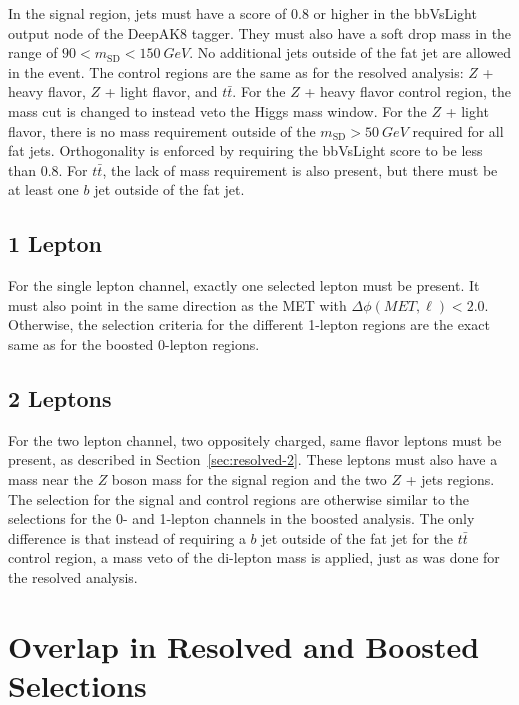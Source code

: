 In the signal region, jets must have a score of 0.8 or higher in the
bbVsLight output node of the DeepAK8 tagger.
They must also have a soft drop mass in the range of $90 < m_\mathrm{SD} < \SI{150}{GeV}$.
No additional jets outside of the fat jet are allowed in the event.
The control regions are the same as for the resolved analysis:
$Z$ + heavy flavor, $Z$ + light flavor, and $t\bar{t}$.
For the $Z$ + heavy flavor control region,
the mass cut is changed to instead veto the Higgs mass window.
For the $Z$ + light flavor, there is no mass requirement outside of the
$m_\textrm{SD} > \SI{50}{GeV}$ required for all fat jets.
Orthogonality is enforced by requiring the bbVsLight score to be less than 0.8.
For $t\bar{t}$, the lack of mass requirement is also present,
but there must be at least one $b$ jet outside of the fat jet.

\subsection{1 Lepton}

For the single lepton channel, exactly one selected lepton must be present.
It must also point in the same direction as the MET with $\Delta \phi(MET, \ell) < 2.0$.
Otherwise, the selection criteria for the different 1-lepton regions
are the exact same as for the boosted 0-lepton regions.

\subsection{2 Leptons}

For the two lepton channel, two oppositely charged, same flavor leptons must be present,
as described in Section~\ref{sec:resolved-2}.
These leptons must also have a mass near the $Z$ boson mass for the signal region
and the two $Z$ + jets regions.
The selection for the signal and control regions are otherwise similar to the selections
for the 0- and 1-lepton channels in the boosted analysis.
The only difference is that instead of requiring a $b$ jet outside of the fat jet
for the $t\bar{t}$ control region,
a mass veto of the di-lepton mass is applied, just as was done for the resolved analysis.

\section{Overlap in Resolved and Boosted Selections}


